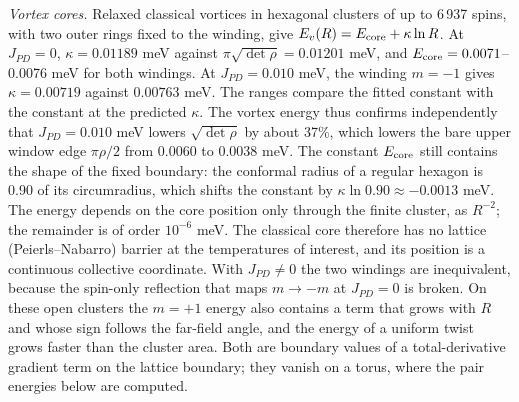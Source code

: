 \emph{Vortex cores.} Relaxed classical vortices in hexagonal clusters
of up to 6\,937 spins, with two outer rings fixed to the winding,
give \(E_v(R)=E_{\rm core}+\kappa\ln R\). At \(J_{PD}=0\),
\(\kappa=0.01189\) meV against \(\pi\sqrt{\det\rho}=0.01201\) meV, and
\(E_{\rm core}=0.0071\)--0.0076 meV for both windings. At
\(J_{PD}=0.010\) meV, the winding \(m=-1\) gives \(\kappa=0.00719\)
against \(0.00763\) meV. The ranges compare the fitted constant with
the constant at the predicted \(\kappa\). The vortex energy thus
confirms independently that \(J_{PD}=0.010\) meV lowers
\(\sqrt{\det\rho}\) by about 37\%, which lowers the bare upper window
edge \(\pi\rho/2\) from 0.0060 to 0.0038 meV. The constant
\(E_{\rm core}\) still contains the shape of the fixed boundary: the
conformal radius of a regular hexagon is 0.90 of its circumradius,
which shifts the constant by \(\kappa\ln0.90\approx-0.0013\) meV. The
energy depends on the core position only through the finite cluster,
as \(R^{-2}\); the remainder is of order \(10^{-6}\) meV. The classical
core therefore has no lattice (Peierls--Nabarro) barrier at the
temperatures of interest, and its position is a continuous collective
coordinate. With \(J_{PD}\neq0\) the two windings are inequivalent,
because the spin-only reflection that maps \(m\to-m\) at
\(J_{PD}=0\) is broken. On these open clusters the \(m=+1\) energy also
contains a term that grows with \(R\) and whose sign follows the
far-field angle, and the energy of a uniform twist grows faster than
the cluster area. Both are boundary values of a total-derivative
gradient term on the lattice boundary; they vanish on a torus, where
the pair energies below are computed.

